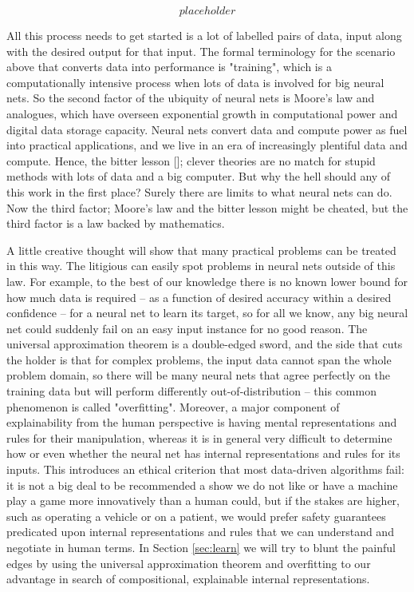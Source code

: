 \[placeholder\]

All this process needs to get started is a lot of labelled pairs of data, input along with the desired output for that input. The formal terminology for the scenario above that converts data into performance is "training", which is a computationally intensive process when lots of data is involved for big neural nets. So the second factor of the ubiquity of neural nets is Moore's law and analogues, which have overseen exponential growth in computational power and digital data storage capacity. Neural nets convert data and compute power as fuel into practical applications, and we live in an era of increasingly plentiful data and compute. Hence, the bitter lesson []; clever theories are no match for stupid methods with lots of data and a big computer. But why the hell should any of this work in the first place? Surely there are limits to what neural nets can do. Now the third factor; Moore's law and the bitter lesson might be cheated, but the third factor is a law backed by mathematics.

\begin{theorem}

\end{theorem}

 A little creative thought will show that many practical problems can be treated in this way. The litigious can easily spot problems in neural nets outside of this law. For example, to the best of our knowledge there is no known lower bound for how much data is required -- as a function of desired accuracy within a desired confidence -- for a neural net to learn its target, so for all we know, any big neural net could suddenly fail on an easy input instance for no good reason. The universal approximation theorem is a double-edged sword, and the side that cuts the holder is that for complex problems, the input data cannot span the whole problem domain, so there will be many neural nets that agree perfectly on the training data but will perform differently out-of-distribution -- this common phenomenon is called "overfitting". Moreover, a major component of explainability from the human perspective is having mental representations and rules for their manipulation, whereas it is in general very difficult to determine how or even whether the neural net has internal representations and rules for its inputs. This introduces an ethical criterion that most data-driven algorithms fail: it is not a big deal to be recommended a show we do not like or have a machine play a game more innovatively than a human could, but if the stakes are higher, such as operating a vehicle or on a patient, we would prefer safety guarantees predicated upon internal representations and rules that we can understand and negotiate in human terms. In Section \ref{sec:learn} we will try to blunt the painful edges by using the universal approximation theorem and overfitting to our advantage in search of compositional, explainable internal representations.